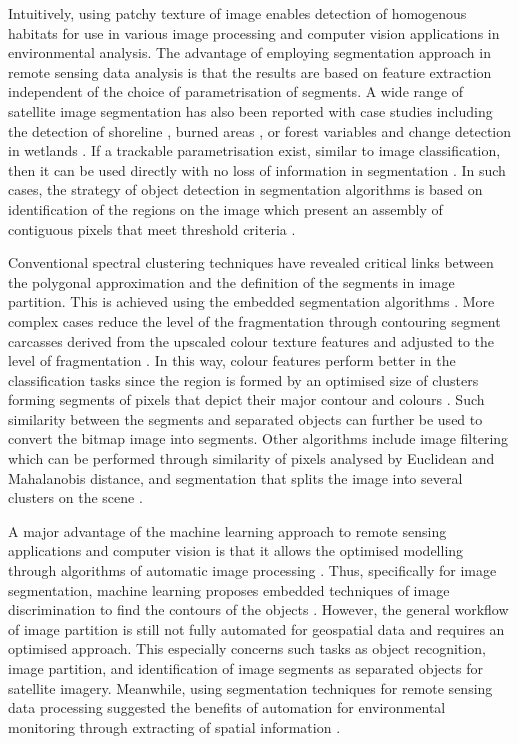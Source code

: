 \documentclass[analytics,article,submit,pdftex,moreauthors]{Definitions/mdpi}
\begin{document}
Intuitively, using patchy texture of image enables detection of homogenous habitats for use in various image processing and computer vision applications in environmental analysis. The advantage of employing segmentation approach in remote sensing data analysis is that the results are based on feature extraction independent of the choice of parametrisation of segments. A wide range of satellite image segmentation has also been reported with case studies including the detection of shoreline \cite{ERDEM2021964}, burned areas \cite{KOTARIDIS2023100944,Toulouse}, or forest variables \cite{MAKELA200166} and change detection in wetlands \cite{ZHANG2023129590}. If a trackable parametrisation exist, similar to image classification, then it can be used directly with no loss of information in segmentation \cite{Kharma}. In such cases, the strategy of object detection in segmentation algorithms is based on identification of the regions on the image which present an assembly of contiguous pixels that meet threshold criteria \cite{Aalan,Awad}. 

Conventional spectral clustering techniques have revealed critical links between the polygonal approximation and the definition of the segments in image partition. This is achieved using the embedded segmentation algorithms \cite{Saha,Pugazhenthi,Congetal2018}. More complex cases reduce the level of the fragmentation through contouring segment carcasses derived from the upscaled colour texture features and adjusted to the level of fragmentation \cite{1370344}. In this way, colour features perform better in the classification tasks since the region is formed by an optimised size of clusters forming segments of pixels that depict their major contour and colours \cite{1421832}. Such similarity between the segments and separated objects can further be used to convert the bitmap image into segments. Other algorithms include image filtering which can be performed through similarity of pixels analysed by Euclidean and Mahalanobis distance, and segmentation that splits the image into several clusters on the scene \cite{8302195,9302320,5432655}. 

A major advantage of the machine learning approach to remote sensing applications and computer vision is that it allows the optimised modelling through algorithms of automatic image processing \cite{Yamashita,OLIVEIRA2020111830,Bauer,Onishi}. Thus, specifically for image segmentation, machine learning proposes embedded techniques of image discrimination to find the contours of the objects \cite{10073848,8402497,9113204}. However, the general workflow of image partition is still not fully automated for geospatial data and requires an optimised approach. This especially concerns such tasks as object recognition, image partition, and identification of image segments as separated objects for satellite imagery. Meanwhile, using segmentation techniques for remote sensing data processing suggested the benefits of automation for environmental monitoring through extracting of spatial information \cite{Colwell}. 
\end{document}
